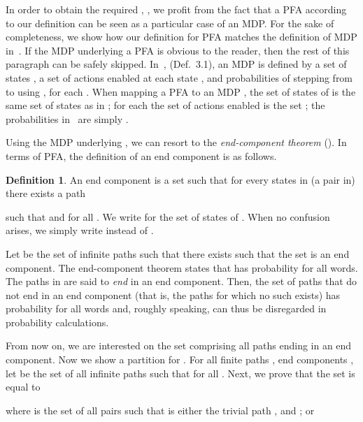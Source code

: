 \documentclass[final,3p,times,twocolumn]{elsarticle}
\theoremstyle{plain}
\theoremstyle{definition}
\newtheorem{definition}{Definition}
\newcommand{\recallExternalThm}[1]{Thm.~{#1}}
\newcommand{\recallExternalDef}[1]{Def.~{#1}}
\begin{document}
In order to obtain the required , , we profit from the fact that a PFA
according to our definition can be seen as a particular case of an MDP. For the
sake of completeness, we show how our definition for PFA matches the definition
of MDP in~\cite{thesis:deAlfaro}. If the MDP underlying a PFA  is obvious
to the reader, then the rest of this paragraph can be safely skipped.
In~\cite{thesis:deAlfaro}, (\recallExternalDef{3.1}), an MDP 
is defined by a set of states , a set of actions  enabled at each
state , and probabilities  of stepping from  to  using ,
for each . When mapping a PFA  to an MDP , the set of
states  of  is the same set of states as in ; for each  the
set  of actions enabled is the set ; the probabilities
 in~\cite{thesis:deAlfaro} are simply .

Using the MDP underlying , we can resort to the \emph{end-component
theorem} (\cite[\recallExternalThm{3.2}]{thesis:deAlfaro}). In terms of PFA,
the definition of an end component is as follows.
\begin{definition}
\label{def:end-component}
An end component is a set  such that for
every states  in (a pair in)  there
exists a path

such that  and
 for all
. We write  for the set of states of .
When no confusion arises, we simply write  instead of
.
\end{definition}
Let  be the set of infinite paths
 such that there exists  such that
the set  is an end component. The
end-component theorem states that  has probability  for all
words. The paths in  are said to \emph{end} in an end component.
Then, the set of paths that do not end in an end component (that is, the paths
for which no such  exists) has probability  for all words and, roughly
speaking, can thus be disregarded in probability calculations.

From now on, we are interested on the set  comprising all paths
ending in an end component. Now we show a partition for . For all
finite paths , end components , let  be the set of all
infinite paths  such that
 for all . Next, we prove that the set
 is equal to

where  is the set of all pairs  such that
 is either the trivial path , and ; or
\end{document}
